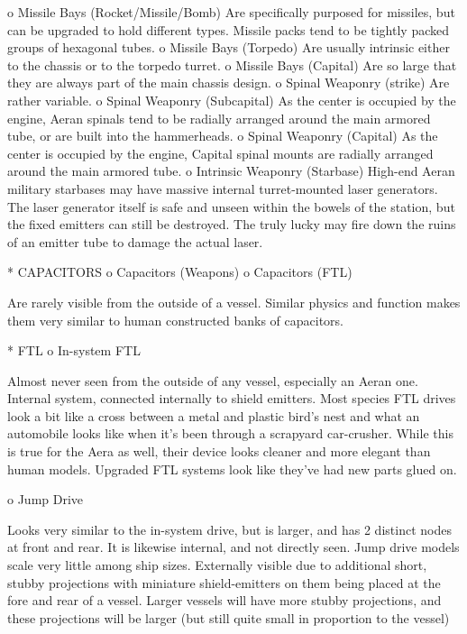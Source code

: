           o Missile Bays (Rocket/Missile/Bomb)
            Are specifically purposed for missiles, but can be upgraded to hold different types.
            Missile packs tend to be tightly packed groups of hexagonal tubes.
          o Missile Bays (Torpedo)
            Are usually intrinsic either to the chassis or to the torpedo turret.
          o Missile Bays (Capital)
            Are so large that they are always part of the main chassis design.
          o Spinal Weaponry (strike)
            Are rather variable.
          o Spinal Weaponry (Subcapital)
            As the center is occupied by the engine, Aeran spinals tend to be radially arranged around the main armored tube, or are built into the hammerheads.
          o Spinal Weaponry (Capital)
            As the center is occupied by the engine, Capital spinal mounts are radially arranged around the main armored tube.
          o Intrinsic Weaponry (Starbase)
            High-end Aeran military starbases may have massive internal turret-mounted laser generators. The laser generator itself is safe and unseen within the bowels of the station, but the fixed emitters can still be destroyed. The truly lucky may fire down the ruins of an emitter tube to damage the actual laser.



    * CAPACITORS
          o Capacitors (Weapons)
          o Capacitors (FTL)


Are rarely visible from the outside of a vessel. Similar physics and function makes them very similar to human constructed banks of capacitors.

    * FTL
          o In-system FTL

Almost never seen from the outside of any vessel, especially an Aeran one. Internal system, connected internally to shield emitters. Most species FTL drives look a bit like a cross between a metal and plastic bird's nest and what an automobile looks like when it's been through a scrapyard car-crusher. While this is true for the Aera as well, their device looks cleaner and more elegant than human models.
Upgraded FTL systems look like they've had new parts glued on.

          o Jump Drive

Looks very similar to the in-system drive, but is larger, and has 2 distinct nodes at front and rear. It is likewise internal, and not directly seen.
Jump drive models scale very little among ship sizes.
Externally visible due to additional short, stubby projections with miniature shield-emitters on them being placed at the fore and rear of a vessel.
Larger vessels will have more stubby projections, and these projections will be larger (but still quite small in proportion to the vessel)


